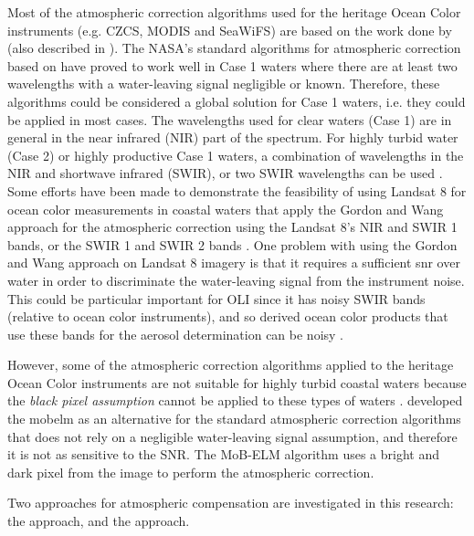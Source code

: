 Most of the atmospheric correction algorithms used for the heritage Ocean Color instruments (e.g. CZCS, MODIS and SeaWiFS) are based on the work done by \citet{Gordon:1994} (also described in \citet{Gordon:1997}). The NASA's standard algorithms for atmospheric correction based on \citet{Gordon:1994} have proved to work well in Case 1 waters where there are at least two wavelengths with a water-leaving signal negligible or known. Therefore, these algorithms could be considered a global solution for Case 1 waters, i.e. they could be applied in most cases. The wavelengths used for clear waters (Case 1) are in general in the near infrared (NIR) part of the spectrum. For highly turbid water (Case 2) or highly productive Case 1 waters, a combination of wavelengths in the NIR and shortwave infrared (SWIR), or two SWIR wavelengths can be used \citep{Wang:2007,Wang:2007dz,Wang2009}. Some efforts have been made to demonstrate the feasibility of using Landsat 8 for ocean color measurements in coastal waters that apply the Gordon and Wang approach for the atmospheric correction using the Landsat 8's NIR and SWIR 1 bands, or the SWIR 1 and SWIR 2 bands \citep{Vanhellemont2014a,Vanhellemont2014,Vanhellemont:2015,Franz:2015}. One problem with using the Gordon and Wang approach on Landsat 8 imagery is that it requires a sufficient \gls{snr} over water in order to discriminate the water-leaving signal from the instrument noise. This could be particular important for OLI since it has noisy SWIR bands (relative to ocean color instruments), and so derived ocean color products that use these bands for the aerosol determination can be noisy \citep{Vanhellemont2014a}.

However, some of the atmospheric correction algorithms applied to the heritage Ocean Color instruments are not suitable for highly turbid coastal waters because the {\it black pixel assumption} cannot be applied to these types of waters \citep{Patt2003}. \citet{Concha2014SPIE} developed the \gls{mobelm} as an alternative for the standard atmospheric correction algorithms that does not rely on a negligible water-leaving signal assumption, and therefore it is not as sensitive to the SNR. The MoB-ELM algorithm uses a bright and dark pixel from the image to perform the atmospheric correction. %

Two approaches for atmospheric compensation are investigated in this research: the \citet{Gordon:1994} approach, and the \citet{Concha2014SPIE} approach.

